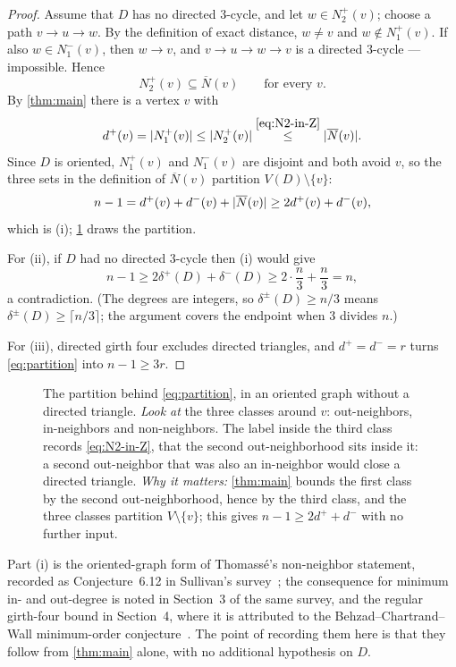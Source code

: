 
\begin{proof}
Assume that $D$ has no directed $3$-cycle, and let $w\in N_2^+(v)$; choose a path $v\to u\to w$. By
the definition of exact distance, $w\ne v$ and $w\notin N_1^+(v)$. If also $w\in N_1^-(v)$, then
$w\to v$, and $v\to u\to w\to v$ is a directed $3$-cycle --- impossible. Hence
\begin{equation}\label{eq:N2-in-Z}
 N_2^+(v)\subseteq\overline N(v)\qquad\text{for every }v .
\end{equation}
By \cref{thm:main} there is a vertex $v$ with
\[
 d^+(v)=\lvert N_1^+(v)\rvert\le\lvert N_2^+(v)\rvert\overset{\eqref{eq:N2-in-Z}}{\le}\lvert \overline N(v)\rvert .
\]
Since $D$ is oriented, $N_1^+(v)$ and $N_1^-(v)$ are disjoint and both avoid $v$, so the three sets in
the definition of $\overline N(v)$ partition $V(D)\setminus\{v\}$:
\begin{equation}\label{eq:partition}
 n-1=d^+(v)+d^-(v)+\lvert \overline N(v)\rvert\ge 2d^+(v)+d^-(v),
\end{equation}
which is (i); \cref{fig:cycles} draws the partition.

For (ii), if $D$ had no directed $3$-cycle then (i) would give
\[
 n-1\ge2\delta^+(D)+\delta^-(D)\ge2\cdot\frac n3+\frac n3=n,
\]
a contradiction. (The degrees are integers, so $\delta^\pm(D)\ge n/3$ means
$\delta^\pm(D)\ge\lceil n/3\rceil$; the argument covers the endpoint when $3$ divides $n$.)

For (iii), directed girth four excludes directed triangles, and $d^+=d^-=r$ turns
\eqref{eq:partition} into $n-1\ge3r$.
\end{proof}

\begin{figure}[t]
\centering

\caption{The partition behind \eqref{eq:partition}, in an oriented graph without a directed triangle.
\emph{Look at} the three classes around $v$: out-neighbors, in-neighbors and non-neighbors. The
label inside the third class records \eqref{eq:N2-in-Z}, that the second out-neighborhood
sits inside it: a second out-neighbor that was also an in-neighbor would close a directed
triangle. \emph{Why it matters:} \cref{thm:main} bounds the first class by the second
out-neighborhood, hence by the third class, and the three classes partition $V\setminus\{v\}$; this
gives $n-1\ge2d^++d^-$ with no further input.}
\label{fig:cycles}
\end{figure}

\begin{remark}\label{rem:cycles-history}
Part (i) is the oriented-graph form of Thomass\'e's non-neighbor statement, recorded as
Conjecture~6.12 in Sullivan's survey~\cite{Sullivan2006}; the consequence for minimum in- and
out-degree is noted in Section~3 of the same survey, and the regular girth-four bound in Section~4,
where it is attributed to the Behzad--Chartrand--Wall minimum-order
conjecture~\cite{BehzadChartrandWall1970}. The point of recording them here is that they follow from
\cref{thm:main} alone, with no additional hypothesis on $D$.
\end{remark}
